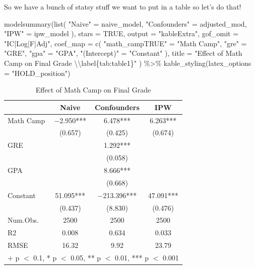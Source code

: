 \documentclass[]{tufte-handout}
\newenvironment{Shaded}{}{}
\newcommand{\AttributeTok}[1]{\textcolor[rgb]{0.49,0.56,0.16}{#1}}
\newcommand{\ConstantTok}[1]{\textcolor[rgb]{0.53,0.00,0.00}{#1}}
\newcommand{\FunctionTok}[1]{\textcolor[rgb]{0.02,0.16,0.49}{#1}}
\newcommand{\NormalTok}[1]{#1}
\newcommand{\OtherTok}[1]{\textcolor[rgb]{0.00,0.44,0.13}{#1}}
\newcommand{\SpecialCharTok}[1]{\textcolor[rgb]{0.25,0.44,0.63}{#1}}
\newcommand{\StringTok}[1]{\textcolor[rgb]{0.25,0.44,0.63}{#1}}
\begin{document}
So we have a bunch of statsy stuff we want to put in a table so let's do
that!

\begin{Shaded}
\begin{Highlighting}[]
\FunctionTok{modelsummary}\NormalTok{(}\FunctionTok{list}\NormalTok{(}
  \StringTok{"Naive"} \OtherTok{=}\NormalTok{ naive\_model, }\StringTok{"Confounders"} \OtherTok{=}\NormalTok{ adjusted\_mod,}
  \StringTok{"IPW"} \OtherTok{=}\NormalTok{ ipw\_model}
\NormalTok{),}
\AttributeTok{stars =} \ConstantTok{TRUE}\NormalTok{,}
\AttributeTok{output =} \StringTok{"kableExtra"}\NormalTok{,}
\AttributeTok{gof\_omit =} \StringTok{"IC|Log|F|Adj"}\NormalTok{,}
\AttributeTok{coef\_map =} \FunctionTok{c}\NormalTok{(}
  \StringTok{"math\_campTRUE"} \OtherTok{=} \StringTok{"Math Camp"}\NormalTok{, }\StringTok{"gre"} \OtherTok{=} \StringTok{"GRE"}\NormalTok{,}
  \StringTok{"gpa"} \OtherTok{=} \StringTok{"GPA"}\NormalTok{, }\StringTok{"(Intercept)"} \OtherTok{=} \StringTok{"Constant"}
\NormalTok{),}
\AttributeTok{title =} \StringTok{"Effect of Math Camp on Final Grade }\SpecialCharTok{\textbackslash{}\textbackslash{}}\StringTok{label\{tab:table1\}"}
\NormalTok{) }\SpecialCharTok{\%\textgreater{}\%}
  \FunctionTok{kable\_styling}\NormalTok{(}\AttributeTok{latex\_options =} \StringTok{"HOLD\_position"}\NormalTok{)}
\end{Highlighting}
\end{Shaded}

\begin{table}[H]

\caption{\label{tab:table-making}Effect of Math Camp on Final Grade \label{tab:table1}}
\centering
\begin{tabular}[t]{lccc}
\toprule
  & Naive & Confounders & IPW\\
\midrule
Math Camp & \num{-2.950}*** & \num{6.478}*** & \num{6.263}***\\
 & (\num{0.657}) & (\num{0.425}) & (\num{0.674})\\
GRE &  & \num{1.292}*** & \\
 &  & (\num{0.058}) & \\
GPA &  & \num{8.666}*** & \\
 &  & (\num{0.668}) & \\
Constant & \num{51.095}*** & \num{-213.396}*** & \num{47.091}***\\
 & (\num{0.437}) & (\num{8.830}) & (\num{0.476})\\
\midrule
Num.Obs. & \num{2500} & \num{2500} & \num{2500}\\
R2 & \num{0.008} & \num{0.634} & \num{0.033}\\
RMSE & \num{16.32} & \num{9.92} & \num{23.79}\\
\bottomrule
\multicolumn{4}{l}{\rule{0pt}{1em}+ p $<$ 0.1, * p $<$ 0.05, ** p $<$ 0.01, *** p $<$ 0.001}\\
\end{tabular}
\end{table}
\end{document}
